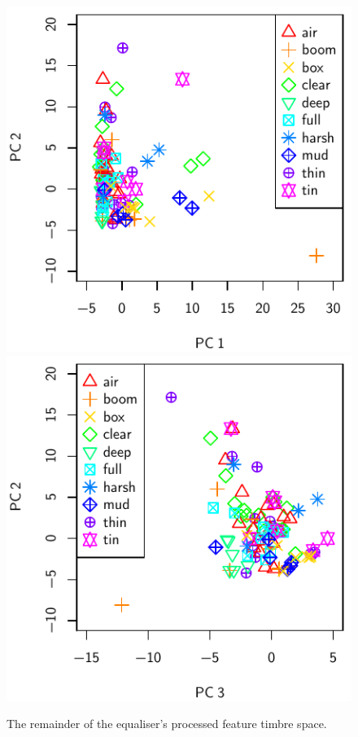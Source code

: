 			\begin{figure}[h!]
				\centering
				\subfloat
				{
					\includegraphics{chapter4/Images/EqualiserProcessedPCA1-2.pdf}
					\label{fig:EqualiserProcessedPCA1-2}
				}
				\quad
				\subfloat
				{
					\includegraphics{chapter4/Images/EqualiserProcessedPCA3-2.pdf}
					\label{fig:EqualiserProcessedPCA3-2}
				}
				\caption{The remainder of the equaliser's processed feature timbre space.}
				\label{fig:EqualiserProcessedPCAs}
			\end{figure}

